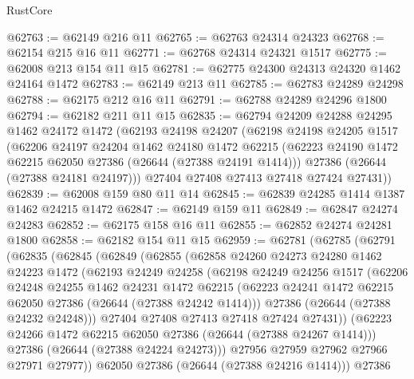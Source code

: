 \begin{lexlean}{RustCore}
\begin{coremodule}
@62763 := @62149 @216 @11
@62765 := @62763 @24314 @24323
@62768 := @62154 @215 @16 @11
@62771 := @62768 @24314 @24321 @1517
@62775 := @62008 @213 @154 @11 @15
@62781 := @62775 @24300 @24313 @24320 @1462 @24164 @1472
@62783 := @62149 @213 @11
@62785 := @62783 @24289 @24298
@62788 := @62175 @212 @16 @11
@62791 := @62788 @24289 @24296 @1800
@62794 := @62182 @211 @11 @15
@62835 := @62794
    @24209
    @24288
    @24295
    @1462
    @24172
    @1472
    (@62193
      @24198
      @24207
      (@62198
        @24198
        @24205
        @1517
        (@62206
          @24197
          @24204
          @1462
          @24180
          @1472
          @62215
          (@62223 @24190 @1472 @62215 @62050 @27386 (@26644 (@27388 @24191 @1414)))
          @27386
          (@26644 (@27388 @24181 @24197)))
        @27404
        @27408
        @27413
        @27418
        @27424
        @27431))
@62839 := @62008 @159 @80 @11 @14
@62845 := @62839 @24285 @1414 @1387 @1462 @24215 @1472
@62847 := @62149 @159 @11
@62849 := @62847 @24274 @24283
@62852 := @62175 @158 @16 @11
@62855 := @62852 @24274 @24281 @1800
@62858 := @62182 @154 @11 @15
@62959 := @62781
    (@62785
      (@62791
        (@62835
          (@62845
            (@62849
              (@62855
                (@62858
                  @24260
                  @24273
                  @24280
                  @1462
                  @24223
                  @1472
                  (@62193
                    @24249
                    @24258
                    (@62198
                      @24249
                      @24256
                      @1517
                      (@62206
                        @24248
                        @24255
                        @1462
                        @24231
                        @1472
                        @62215
                        (@62223 @24241 @1472 @62215 @62050 @27386 (@26644 (@27388 @24242 @1414)))
                        @27386
                        (@26644 (@27388 @24232 @24248)))
                      @27404
                      @27408
                      @27413
                      @27418
                      @27424
                      @27431))
                  (@62223 @24266 @1472 @62215 @62050 @27386 (@26644 (@27388 @24267 @1414)))
                  @27386
                  (@26644 (@27388 @24224 @24273)))
                @27956
                @27959
                @27962
                @27966
                @27971
                @27977))
            @62050
            @27386
            (@26644 (@27388 @24216 @1414)))
          @27386

\end{coremodule}
\end{lexlean}
